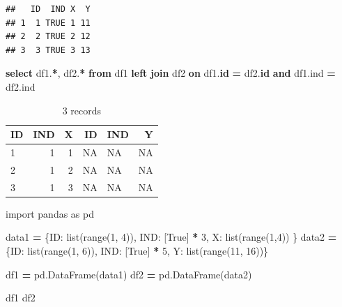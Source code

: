 \documentclass[
]{krantz}
\makeatletter
\newenvironment{Shaded}{\begin{snugshade}}{\end{snugshade}}
\newcommand{\BuiltInTok}[1]{#1}
\newcommand{\DecValTok}[1]{\textcolor[rgb]{0.06,0.06,0.06}{#1}}
\newcommand{\ImportTok}[1]{#1}
\newcommand{\KeywordTok}[1]{\textcolor[rgb]{0.27,0.27,0.27}{\textbf{#1}}}
\newcommand{\NormalTok}[1]{#1}
\newcommand{\OperatorTok}[1]{\textcolor[rgb]{0.43,0.43,0.43}{\textbf{#1}}}
\newcommand{\StringTok}[1]{\textcolor[rgb]{0.5,0.5,0.5}{#1}}
\newcommand{\VariableTok}[1]{\textcolor[rgb]{0,0,0}{#1}}
\newenvironment{kframe}{%
\medskip{}
\setlength{\fboxsep}{.8em}
 \def\at@end@of@kframe{}%
 \ifinner\ifhmode%
  \def\at@end@of@kframe{\end{minipage}}%
  \begin{minipage}{\columnwidth}%
 \fi\fi%
 \def\FrameCommand##1{\hskip\@totalleftmargin \hskip-\fboxsep
 \colorbox{shadecolor}{##1}\hskip-\fboxsep
     \hskip-\linewidth \hskip-\@totalleftmargin \hskip\columnwidth}%
 \MakeFramed {\advance\hsize-\width
   \@totalleftmargin\z@ \linewidth\hsize
   \@setminipage}}%
 {\par\unskip\endMakeFramed%
 \at@end@of@kframe}
\renewenvironment{Shaded}{\begin{kframe}}{\end{kframe}}
\makeatother
\begin{document}
\begin{verbatim}
##   ID  IND X  Y
## 1  1 TRUE 1 11
## 2  2 TRUE 2 12
## 3  3 TRUE 3 13
\end{verbatim}

\begin{Shaded}
\begin{Highlighting}[]
\KeywordTok{select}\NormalTok{ df1.}\OperatorTok{*}\NormalTok{, df2.}\OperatorTok{*}
\KeywordTok{from} 
\NormalTok{ df1 }
 \KeywordTok{left} \KeywordTok{join}
\NormalTok{ df2}
 \KeywordTok{on}
\NormalTok{ df1.}\KeywordTok{id} \OperatorTok{=}\NormalTok{ df2.}\KeywordTok{id} \KeywordTok{and}
\NormalTok{ df1.ind }\OperatorTok{=}\NormalTok{ df2.ind}
\end{Highlighting}
\end{Shaded}

\begin{table}

\caption{\label{tab:unnamed-chunk-79}3 records}
\centering
\begin{tabular}[t]{l|r|r|r|l|r}
\hline
ID & IND & X & ID & IND & Y\\
\hline
1 & 1 & 1 & NA & NA & NA\\
\hline
2 & 1 & 2 & NA & NA & NA\\
\hline
3 & 1 & 3 & NA & NA & NA\\
\hline
\end{tabular}
\end{table}

\begin{Shaded}
\begin{Highlighting}[]
\ImportTok{import}\NormalTok{ pandas }\ImportTok{as}\NormalTok{ pd }

\NormalTok{data1 }\OperatorTok{=}\NormalTok{ \{}\StringTok{\textquotesingle{}ID\textquotesingle{}}\NormalTok{: }\BuiltInTok{list}\NormalTok{(}\BuiltInTok{range}\NormalTok{(}\DecValTok{1}\NormalTok{, }\DecValTok{4}\NormalTok{)),}
        \StringTok{\textquotesingle{}IND\textquotesingle{}}\NormalTok{: [}\VariableTok{True}\NormalTok{] }\OperatorTok{*} \DecValTok{3}\NormalTok{,}
        \StringTok{\textquotesingle{}X\textquotesingle{}}\NormalTok{: }\BuiltInTok{list}\NormalTok{(}\BuiltInTok{range}\NormalTok{(}\DecValTok{1}\NormalTok{,}\DecValTok{4}\NormalTok{))}
\NormalTok{        \}}
\NormalTok{data2 }\OperatorTok{=}\NormalTok{ \{}\StringTok{\textquotesingle{}ID\textquotesingle{}}\NormalTok{: }\BuiltInTok{list}\NormalTok{(}\BuiltInTok{range}\NormalTok{(}\DecValTok{1}\NormalTok{, }\DecValTok{6}\NormalTok{)),}
         \StringTok{\textquotesingle{}IND\textquotesingle{}}\NormalTok{: [}\StringTok{\textquotesingle{}True\textquotesingle{}}\NormalTok{] }\OperatorTok{*} \DecValTok{5}\NormalTok{,}
        \StringTok{\textquotesingle{}Y\textquotesingle{}}\NormalTok{: }\BuiltInTok{list}\NormalTok{(}\BuiltInTok{range}\NormalTok{(}\DecValTok{11}\NormalTok{, }\DecValTok{16}\NormalTok{))\}}

\NormalTok{df1 }\OperatorTok{=}\NormalTok{ pd.DataFrame(data1)}
\NormalTok{df2 }\OperatorTok{=}\NormalTok{ pd.DataFrame(data2)}

\NormalTok{df1}
\NormalTok{df2}
\end{Highlighting}
\end{Shaded}
\end{document}
